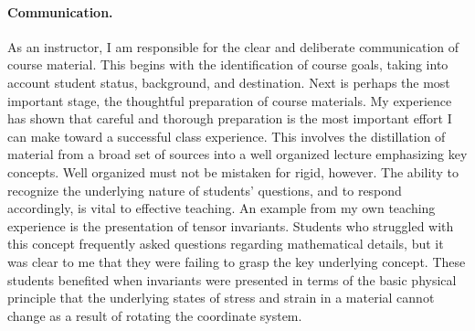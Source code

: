 \documentclass[11pt]{article}
\begin{document}



\paragraph{Communication.}  As an instructor, I am responsible for the clear and deliberate communication of course material.  This begins with the identification of course goals, taking into account student status, background, and destination.  Next is perhaps the most important stage, the thoughtful preparation of course materials.  My experience has shown that careful and thorough preparation is the most important effort I can make toward a successful class experience.  This involves the distillation of material from a broad set of sources into a well organized lecture emphasizing key concepts.  Well organized must not be mistaken for rigid, however.  The ability to recognize the underlying nature of students' questions, and to respond accordingly, is vital to effective teaching.  An example from my own teaching experience is the presentation of tensor invariants.  Students who struggled with this concept frequently asked questions regarding mathematical details, but it was clear to me that they were failing to grasp the key underlying concept.  These students benefited when invariants were presented in terms of the basic physical principle that the underlying states of stress and strain in a material cannot change as a result of rotating the coordinate system.
\end{document}
